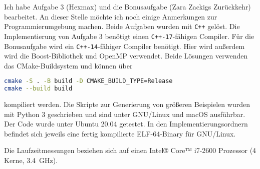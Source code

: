 \documentclass[a4paper,10pt,ngerman]{scrartcl}
\author{\LARGE Teilnahme-ID: \LARGE \TeilnahmeId \\\\
	    \LARGE Bearbeiter/-in: 	    \LARGE \Name\\\\}
\begin{document}
\maketitle
Ich habe Aufgabe 3 (Hexmax) und die Bonusaufgabe (Zara Zackigs Zurückkehr) bearbeitet. 
An dieser Stelle möchte ich noch einige Anmerkungen zur Programmierumgebung machen. 
Beide Aufgaben wurden mit \texttt{C++} gelöst.
Die Implementierung von Aufgabe 3 benötigt einen \texttt{C++-17}-fähigen Compiler. 
Für die Bonusaufgabe wird ein \texttt{C++-14}-fähiger Compiler benötigt. Hier wird außerdem wird die Boost-Bibliothek und OpenMP verwendet.
Beide Lösungen verwenden das CMake-Buildsystem und können über 
\begin{lstlisting}[language=bash]
cmake -S . -B build -D CMAKE_BUILD_TYPE=Release
cmake --build build
\end{lstlisting}
kompiliert werden. Die Skripte zur Generierung von größeren Beispielen wurden mit Python 3 geschrieben und sind unter GNU/Linux und macOS ausführbar.
Der Code wurde unter Ubuntu 20.04 getestet. 
In den Implementierungsordnern befindet sich jeweils eine fertig kompilierte ELF-64-Binary für GNU/Linux. 

Die Laufzeitmessungen beziehen sich auf einen Intel® Core™ i7-2600 Prozessor (4 Kerne, \SI{3.4}{\giga\hertz}).
\end{document}
